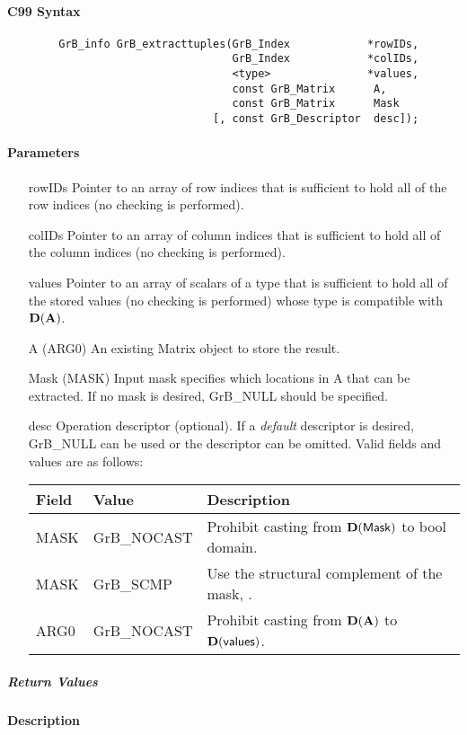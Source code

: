 
\paragraph{C99 Syntax}

\begin{verbatim}
        GrB_info GrB_extracttuples(GrB_Index            *rowIDs,
                                   GrB_Index            *colIDs,
                                   <type>               *values, 
                                   const GrB_Matrix      A,
                                   const GrB_Matrix      Mask
                                [, const GrB_Descriptor  desc]);
\end{verbatim}

\paragraph{Parameters}

\begin{itemize}[leftmargin=1.1in]
	\item[{\sf rowIDs}] Pointer to an array of row indices that is sufficient to
                        hold all of the row indices (no checking is performed).
	\item[{\sf colIDs}] Pointer to an array of column indices that is sufficient to
                        hold all of the column indices (no checking is performed). 
	\item[{\sf values}] Pointer to an array of scalars of a type that is sufficient to
                        hold all of the stored values (no checking is performed) whose
                        type is compatible with $\bold{D}({\bf A})$.
    \item[{\sf A}]      ({\sf ARG0}) An existing Matrix object to store the result.
    \item[{\sf Mask}]   ({\sf MASK}) Input mask specifies which locations in
                        {\sf A} that can be extracted.  If no mask is desired,
	                    {\sf GrB\_NULL} should be specified.
	\item[{\sf desc}]   Operation descriptor (optional). If a
	\emph{default} descriptor is desired, {\sf GrB\_NULL} can be
	used or the descriptor can be omitted.  Valid fields and values are as follows: \\
    \begin{tabular}{lll}
    Field  & Value & Description \\
    \hline
    {\sf MASK} & {\sf GrB\_NOCAST} & Prohibit casting from $\bold{D}({\sf Mask})$ to {\sf bool} domain. \\
    {\sf MASK} & {\sf GrB\_SCMP}   & Use the structural complement of the mask, . \\
    {\sf ARG0} & {\sf GrB\_NOCAST} & Prohibit casting from $\bold{D}({\bf A})$ to $\bold{D}({\sf values})$. \\
    \end{tabular}
\end{itemize}

\subparagraph{Return Values}

\paragraph{Description}
